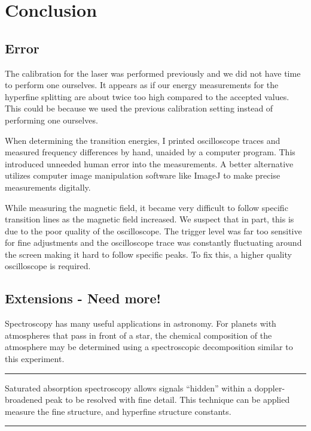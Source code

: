 \documentclass[12pt]{article}
\newcommand{\red}[1]{\textbf{\textcolor{myred1}{#1}}} %
\newcommand{\redmark}{\textcolor{myred1}{\rule{3.5mm}{3.5mm} }} %
\begin{document}
	
	\section{Conclusion}
	
	\subsection{Error}
	The calibration for the laser was performed previously and we did not have time to perform one ourselves. It appears as if our energy measurements for the hyperfine splitting are about twice too high compared to the accepted values. This could be because we used the previous calibration setting instead of performing one ourselves.
	
	When determining the transition energies, I printed oscilloscope traces and measured frequency differences by hand, unaided by a computer program. This introduced unneeded human error into the measurements. A better alternative utilizes computer image manipulation software like ImageJ to make precise measurements digitally.
	
	While measuring the magnetic field, it became very difficult to follow specific transition lines as the magnetic field increased. We suspect that in part, this is due to the poor quality of the oscilloscope. The trigger level was far too sensitive for fine adjustments and the oscilloscope trace was constantly fluctuating around the screen making it hard to follow specific peaks. To fix this, a higher quality oscilloscope is required.
	
	\subsection{Extensions - \red{Need more!}} 
	Spectroscopy has many useful applications in astronomy.	For planets with atmospheres that pass in front of a star, the chemical composition of the atmosphere may be determined using a spectroscopic decomposition similar to this experiment. \redmark
	
	Saturated absorption spectroscopy allows signals ``hidden'' within a doppler-broadened peak to be resolved with fine detail. This technique can be applied measure the fine structure, and hyperfine structure constants. \redmark
	
	\newpage
	
	
	\newpage
	
	
	\nocite{*}
	
	
\end{document}
